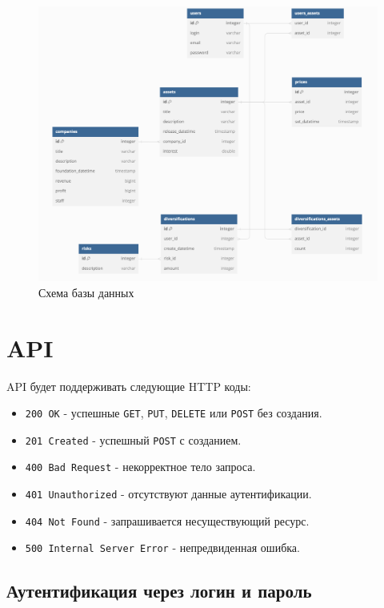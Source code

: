 \documentclass[a4paper, 14pt]{article}
\begin{document}
\begin{figure}[H]
    \centering
    \includegraphics[width=17cm]{resources/14.png}
    \caption{Схема базы данных}
\end{figure}

\section{API}

API будет поддерживать следующие HTTP коды:
\begin{itemize}
    \item \texttt{200 OK} - успешные \texttt{GET}, \texttt{PUT}, \texttt{DELETE} или \texttt{POST} без создания.
    \item \texttt{201 Created} - успешный \texttt{POST} с созданием.
    \item \texttt{400 Bad Request} - некорректное тело запроса.
    \item \texttt{401 Unauthorized} - отсутствуют данные аутентификации.
    \item \texttt{404 Not Found} - запрашивается несуществующий ресурс.
    \item \texttt{500 Internal Server Error} - непредвиденная ошибка.
\end{itemize}

\subsection{Аутентификация через логин и пароль}
\end{document}
